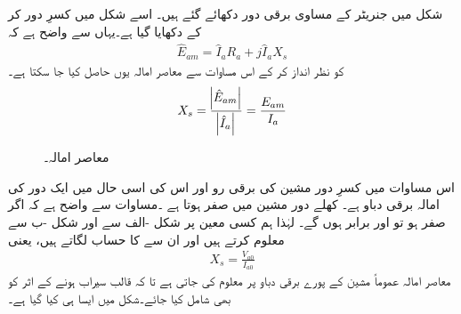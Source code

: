 شکل   میں جنریٹر کے مساوی برقی دور دکھائے گئے ہیں۔ اسے شکل   میں کسرِ دور کر کے دکھایا گیا ہے۔یہاں سے واضح ہے کہ
\begin{align}
\hat{E}_{am}=\hat{I}_a R_a+j \hat{I}_a X_s
\end{align}
 کو نظر انداز کر کے اس مساوات سے معاصر امالہ یوں حاصل کیا جا سکتا ہے۔
\begin{align}
X_s=\frac{\abs{\hat{E}_{am}}}{\abs{\hat{I}_a}}=\frac{E_{am}}{I_a}
\end{align}
%
\begin{figure}
\centering
\caption{معاصر امالہ۔}
\label{شکل_معاصر_امالہ_معاصر}
\end{figure}
اس مساوات میں  کسرِ دور مشین کی برقی رو اور  اس کی اسی حال میں ایک دور کی امالہ برقی دباو ہے۔ کھلے دور مشین میں  صفر ہوتا ہے ۔مساوات  سے واضح ہے کہ اگر  صفر ہو تو   اور  برابر ہوں گے۔ لہٰذا ہم کسی معین  پر شکل -الف سے   اور شکل -ب سے  معلوم کرتے ہیں اور ان سے  کا حساب لگاتے ہیں، یعنی
\begin{align}
X_s=\frac{V_{a0}}{I_{a0}}
\end{align}
معاصر امالہ عموماً مشین کے پورے برقی دباو پر معلوم کی جاتی ہے تا کہ قالب سیراب ہونے کے اثر کو بھی شامل کیا جائے۔شکل میں ایسا ہی کیا گیا ہے۔

